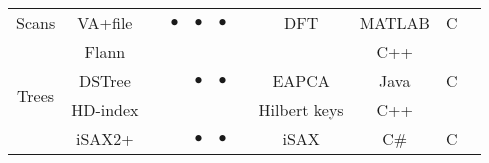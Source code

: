\begin{table*}[tb]
{\begin{tabular*}{\linewidth}{|*{11}{c|}}
			\cline{1-11}			 
			\multicolumn{1}{|c|}{\multirow{1}{*}{{Scans}}}
			& \multicolumn{1}{c|}{VA+file} & {\cite{conf/cikm/Hakan2000}} & $\bullet$&$\bullet$&$\bullet$ & & {DFT} & {MATLAB} & {C} & \checkmark\\	
			\cline{2-11}			 		 			
			\cline{1-11}			 
			\multicolumn{1}{|c|}{\multirow{4}{*}{{Trees}}}
			& \multicolumn{1}{c|}{Flann} & & \cite{flann} & &  & \checkmark  &  & C++ & &\\	
			\cline{2-11}			 
			& \multicolumn{1}{c|}{DSTree} &\cite{conf/vldb/Wang2013} & \cite{conf/vldb/Wang2013} &$\bullet$&$\bullet$&  & EAPCA  & Java & C & \checkmark\\	
			\cline{2-11}			 
			& \multicolumn{1}{c|}{HD-index} & & \cite{hdindex} & &  &   & Hilbert keys & C++ & & \checkmark\\	
			\cline{2-11}			 
			& \multicolumn{1}{c|}{iSAX2+} & \cite{journal/kais/Camerra2014} & \cite{journal/kais/Camerra2014} &$\bullet$&$\bullet$&  &  iSAX &  C\# & C & \checkmark\\	
			\cline{1-11}			 
			\cline{1-11}			 		 
		\end{tabular*}
	} %
	\label{tab:multiprogram}
\end{table*}













